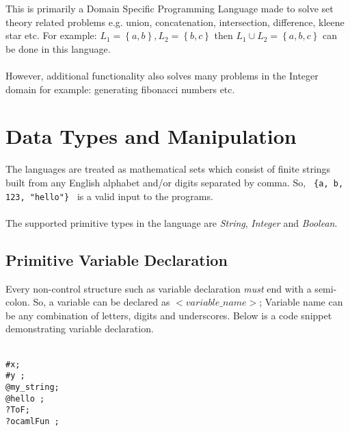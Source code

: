 \documentclass[11pt]{article}
\begin{document}
This is primarily a Domain Specific Programming Language made to solve set theory related problems e.g. union, concatenation, intersection, difference, kleene star etc. For example: $ L_1 = \left\{a, b \right\}, L_2 = \left\{b, c \right\} $ then $ L_1 \cup L_2 = \left\{a, b, c \right\} $ can be done in this language.\\\\ However, additional functionality also solves many problems in the Integer domain for example: generating fibonacci numbers etc.

\section{Data Types and Manipulation}

The languages are treated as mathematical sets which consist of finite strings built from any English alphabet and/or digits separated by comma. So, \texttt{ \{a, b, 123, "hello"\} } is a valid input to the programs.
\\\\
The supported primitive types in the language are \emph{String}, \emph{Integer} and \emph{Boolean}.

\subsection{Primitive Variable Declaration}
Every non-control structure such as variable declaration \emph{must} end with a semi-colon. So, a variable can be declared as \LET $<variable\_name>$; Variable name can be any combination of letters, digits and underscores. Below is a code snippet demonstrating variable declaration.

\begin{texto}
	\texttt{\\
			\LET \#x;  \\
			\LET \#y ;  \\
			\LET @my\_string;  \\
			\LET @hello \ASS {};  \\
			\LET ?ToF;  \\
			\LET ?ocamlFun \ASS \TRUE;  
	 }
\end{texto}
\end{document}
